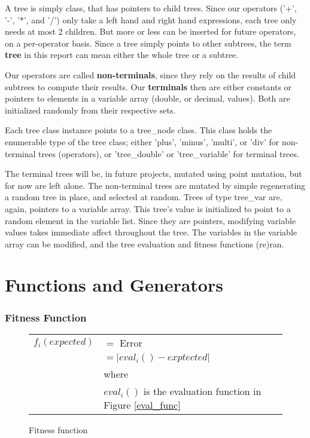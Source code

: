 \documentclass[12pt]{article}
\begin{document}
A tree is simply class, that has pointers to child trees. Since our operators ('+', '-', '*', and '/') only take a left hand and right hand expressions, each tree only needs at most 2 children. But more or less can be inserted for future operators, on a per-operator basis. Since a tree simply points to other subtrees, the term \textbf{tree} in this report can mean either the whole tree or a subtree.

Our operators are called \textbf{non-terminals}, since they rely on the results of child subtrees to compute their results. Our \textbf{terminals} then are either constants or pointers to elements in a variable array (double, or decimal, values). Both are initialized randomly from their respective sets.

Each tree class instance points to a tree\_node class. This class holds the enumerable type of the tree class; either 'plus', 'minus', 'multi', or 'div' for non-terminal trees (operators), or 'tree\_double' or 'tree\_variable' for terminal trees.

The terminal trees will be, in future projects, mutated using point mutation, but for now are left alone. The non-terminal trees are mutated by simple regenerating a random tree in place, and selected at random. Trees of type tree\_var are, again, pointers to a variable array. This tree's value is initialized to point to a random element in the variable list. Since they are pointers, modifying variable values takes immediate affect throughout the tree. The variables in the variable array can be modified, and the tree evaluation and fitness functions (re)ran. 


\part{Functions and Generators}
\section{Fitness Function}
\begin{figure}[!h]
        \begin{center}
		\begin{tabular}{r l}
			$ f_i(expected) $		&	$ = $ Error \\
								&	$ = | eval_i() - exptected | $ \\
								& where \\
								& $ eval_i() $ is the evaluation function in Figure \ref{eval_func}\\
		\end{tabular}
               \caption{Fitness function}
                \label{fit_func}
        \end{center}
\end{figure}
\end{document}

